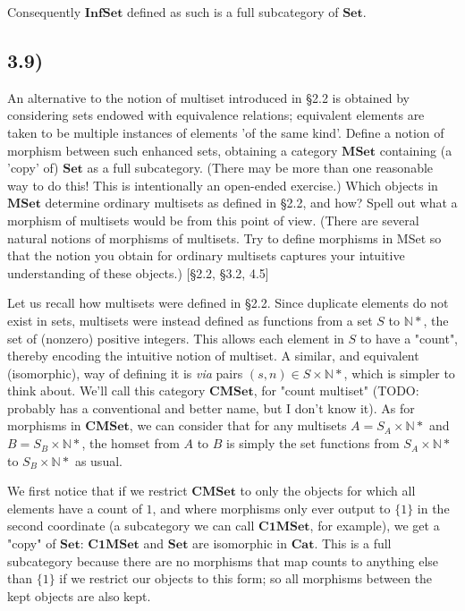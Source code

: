 Consequently $\mathbf{InfSet}$ defined as such is a full subcategory of $\mathbf{Set}$.


\subsection*{3.9)}

An alternative to the notion of multiset introduced in §2.2 is obtained by considering sets endowed with equivalence relations; equivalent elements are taken to be multiple instances of elements 'of the same kind'. Define a notion of morphism between such enhanced sets, obtaining a category $\mathbf{MSet}$ containing (a 'copy' of) $\mathbf{Set}$ as a full subcategory. (There may be more than one reasonable way to do this! This is intentionally an open-ended exercise.) Which objects in $\mathbf{MSet}$ determine ordinary multisets as defined in §2.2, and how? Spell out what a morphism of multisets would be from this point of view. (There are several natural notions of morphisms of multisets. Try to define morphisms in MSet so that the notion you obtain for ordinary multisets captures your intuitive understanding of these objects.) [§2.2, §3.2, 4.5]

Let us recall how multisets were defined in §2.2. Since duplicate elements do not exist in sets, multisets were instead defined as functions from a set $S$ to $\mathbb{N}*$, the set of (nonzero) positive integers. This allows each element in $S$ to have a "count", thereby encoding the intuitive notion of multiset. A similar, and equivalent (isomorphic), way of defining it is \textit{via} pairs $(s, n) \in S \times \mathbb{N}*$, which is simpler to think about. We'll call this category $\mathbf{CMSet}$, for "count multiset" (TODO: probably has a conventional and better name, but I don't know it). As for morphisms in $\mathbf{CMSet}$, we can consider that for any multisets $A = S_A \times \mathbb{N}*$ and $B = S_B \times \mathbb{N}*$, the homset from $A$ to $B$ is simply the set functions from $S_A \times \mathbb{N}*$ to $S_B \times \mathbb{N}*$ as usual.

We first notice that if we restrict $\mathbf{CMSet}$ to only the objects for which all elements have a count of $1$, and where morphisms only ever output to $\{ 1 \}$ in the second coordinate (a subcategory we can call $\mathbf{C1MSet}$, for example), we get a "copy" of $\mathbf{Set}$: $\mathbf{C1MSet}$ and $\mathbf{Set}$ are isomorphic in $\mathbf{Cat}$. This is a full subcategory because there are no morphisms that map counts to anything else than $\{ 1 \}$ if we restrict our objects to this form; so all morphisms between the kept objects are also kept. 

